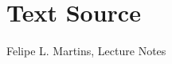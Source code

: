 \documentclass{ximera}
\begin{document}
\begin{example}
\begin{explanation}
 
 
\end{explanation}
 
\end{example}
 
\section*{Text Source}
Felipe L. Martins, Lecture Notes
\end{document}
